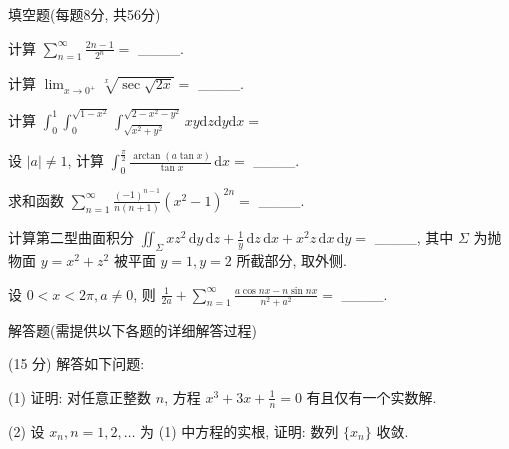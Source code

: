 \par{}
填空题(每题8分, 共56分)\par
计算 $\sum_{n=1}^{\infty} \frac{2n-1}{2^n} =$ \_\_\_\_.\par
计算  $\lim_{x\to0^{+}}\sqrt[x]{\sec\sqrt{2x}}=$  \_\_\_\_.\par
计算 $\int_0^1\int_0^{\sqrt{1 - x^2}}\int_{\sqrt{x^2 + y^2}}^{\sqrt{2 - x^2 - y^2}}xy\mathrm{d}z\mathrm{d}y\mathrm{d}x =$\par
设 $|a| \neq 1$, 计算 $\int_{0}^{\frac{\pi}{2}} \frac{\arctan(a \tan x)}{\tan x} \, \mathrm{d}x =$ \_\_\_\_.\par
求和函数 $\sum_{n=1}^{\infty} \frac{(-1)^{n-1}}{n(n+1)} (x^2 - 1)^{2n} =$ \_\_\_\_.\par
计算第二型曲面积分 $\iint_{\Sigma} x z^{2} \, \mathrm{d}y \, \mathrm{d}z + \frac{1}{y} \, \mathrm{d}z \, \mathrm{d}x + x^{2} z \, \mathrm{d}x \, \mathrm{d}y =$ \_\_\_\_, 其中 $\Sigma$ 为抛物面 $y = x^{2} + z^{2}$ 被平面 $y = 1, y = 2$ 所截部分, 取外侧.\par
设 $0 < x < 2\pi, a \neq 0$, 则 $\frac{1}{2a} + \sum_{n=1}^{\infty} \frac{a \cos nx - n \sin nx}{n^2 + a^2} =$ \_\_\_\_.\par
\par{}
解答题(需提供以下各题的详细解答过程)\par
(15 分) 解答如下问题:\par
(1) 证明: 对任意正整数 $n$, 方程 $x^{3} + 3x + \frac{1}{n} = 0$ 有且仅有一个实数解.\par
(2) 设 $x_{n}, n = 1,2,\dots$ 为 (1) 中方程的实根, 证明: 数列 $\{x_{n}\}$ 收敛.\par
